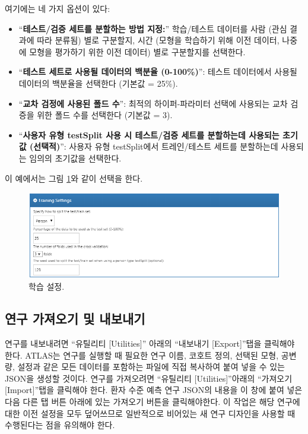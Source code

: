 \documentclass[11pt]{book}
\providecommand{\tightlist}{%
  \setlength{\itemsep}{0pt}\setlength{\parskip}{0pt}}
\theoremstyle{definition}
\theoremstyle{definition}
\theoremstyle{definition}
\theoremstyle{remark}
\begin{document}
여기에는 네 가지 옵션이 있다:

\begin{itemize}
\tightlist
\item
  ``\textbf{테스트/검증 세트를 분할하는 방법 지정:}'' 학습/테스트
  데이터를 사람 (관심 결과에 따라 분류됨) 별로 구분할지, 시간 (모형을
  학습하기 위해 이전 데이터, 나중에 모형을 평가하기 위한 이전 데이터)
  별로 구분할지를 선택한다.
\item
  ``\textbf{테스트 세트로 사용될 데이터의 백분율 (0-100\%)}'': 테스트
  데이터에서 사용될 데이터의 백분율을 선택한다 (기본값 = 25\%).
\item
  ``\textbf{교차 검정에 사용된 폴드 수}'': 최적의 하이퍼-파라미터 선택에
  사용되는 교차 검증을 위한 폴드 수를 선택한다 (기본값 = 3).
\item
  ``\textbf{사용자 유형 testSplit 사용 시 테스트/검증 세트를 분할하는데
  사용되는 초기값 (선택적)}'': 사용자 유형 testSplit에서 트레인/테스트
  세트를 분할하는데 사용되는 임의의 초기값을 선택한다.
\end{itemize}

이 예에서는 그림 \ref{fig:trainingSettings}와 같이 선택을 한다.

\begin{figure}

{\centering \includegraphics[width=1\linewidth]{images/PatientLevelPrediction/trainingSettings} 

}

\caption{학습 설정.}\label{fig:trainingSettings}
\end{figure}

\subsection{연구 가져오기 및 내보내기}\label{---}

연구를 내보내려면 ``유틸리티 {[}Utilities{]}'' 아래의 ``내보내기
{[}Export{]}''탭을 클릭해야 한다. ATLAS는 연구를 실행할 때 필요한 연구
이름, 코호트 정의, 선택된 모형, 공변량, 설정과 같은 모든 데이터를
포함하는 파일에 직접 복사하여 붙여 넣을 수 있는 JSON을 생성할 것이다.
연구를 가져오려면 ``유틸리티 {[}Utilities{]}''아래의 ``가져오기
{[}Import{]}''탭을 클릭해야 한다. 환자 수준 예측 연구 JSON의 내용을 이
창에 붙여 넣은 다음 다른 탭 버튼 아래에 있는 가져오기 버튼을
클릭해야한다. 이 작업은 해당 연구에 대한 이전 설정을 모두 덮어쓰므로
일반적으로 비어있는 새 연구 디자인을 사용할 때 수행된다는 점을 유의해야
한다.
\end{document}
